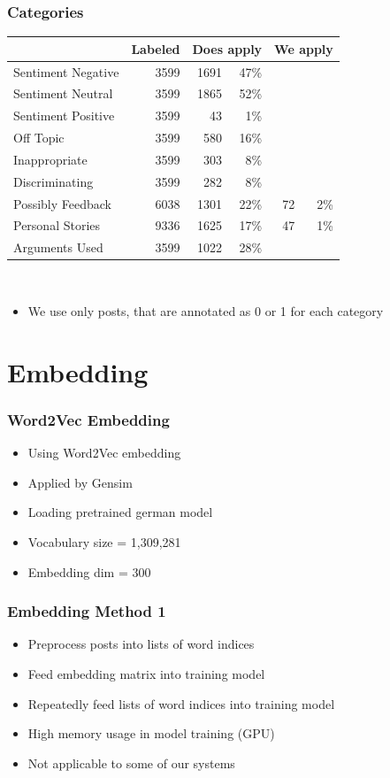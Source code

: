 \documentclass[compress,aspectratio=169]{beamer} %
\begin{document}
\begin{frame}[fragile]
	\frametitle{Categories}
	\centering
	\begin{tabular}{l r r r r r}
		& Labeled & \multicolumn{2}{c}{Does apply} & \multicolumn{2}{c}{We apply} \\
		\hline
		Sentiment Negative & 3599 & 1691 & 47\% \\
		Sentiment Neutral & 3599 & 1865 & 52\% \\
		Sentiment Positive & 3599 & 43 & 1\% \\
		Off Topic & 3599 & 580 & 16\% \\
		Inappropriate & 3599 & 303 & 8\%\\
		Discriminating & 3599 & 282 & 8\%\\
		Possibly Feedback & 6038 & 1301 & 22\% & 72 & 2\%\\
		Personal Stories & 9336 & 1625 & 17\% & 47 & 1\%\\
		Arguments Used & 3599 & 1022 & 28\%\\
	\end{tabular}\\
	{\hfill\tiny\cite{Schabus17}}
	\vspace{5mm}
	\begin{itemize}
		\item We use only posts, that are annotated as 0 or 1 for each category
	\end{itemize}
\end{frame}


\section{Embedding}

\begin{frame}[fragile]
	\frametitle{Word2Vec Embedding}
	\begin{itemize}
		\item Using Word2Vec embedding~\cite{word2vec}
		\item Applied by Gensim~\cite{gensim}
		\item Loading pretrained german model~\cite{depset.ai}
		\item Vocabulary size = 1,309,281
		\item Embedding dim = 300
	\end{itemize}
\end{frame}

\begin{frame}[fragile]
	\frametitle{Embedding Method 1}
	\begin{itemize}
		\item Preprocess posts into lists of word indices
		\item Feed embedding matrix into training model
		\item Repeatedly feed lists of word indices into training model
		\item High memory usage in model training (GPU)
		\item Not applicable to some of our systems
	\end{itemize}
\end{frame}
\end{document}
